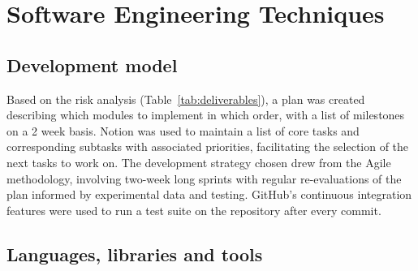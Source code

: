 \documentclass[12pt,a4paper,twoside,openany]{report} \usepackage[pdfborder={0 0 0}]{hyperref}    %
\theoremstyle{definition} \newtheorem{definition}{Definition}[section]
\begin{document}
\section{Software Engineering Techniques}
\label{sec:softwareEnginerring}

\subsection{Development model}
\label{sub:devModel}

Based on the risk analysis (Table~\ref{tab:deliverables}), a plan was created describing which modules to implement in
which order, with a list of milestones on a 2 week basis. Notion was used to maintain a list of core tasks and
corresponding subtasks with associated priorities, facilitating the selection of the next tasks to work on. The
development strategy chosen drew from the Agile methodology, involving two-week long sprints with regular re-evaluations
of the plan informed by experimental data and testing. GitHub's continuous integration features were used to run a test
suite on the repository after every commit.  


\subsection{Languages, libraries and tools}
\label{sub:languagesLibrariesTools}
\end{document}
